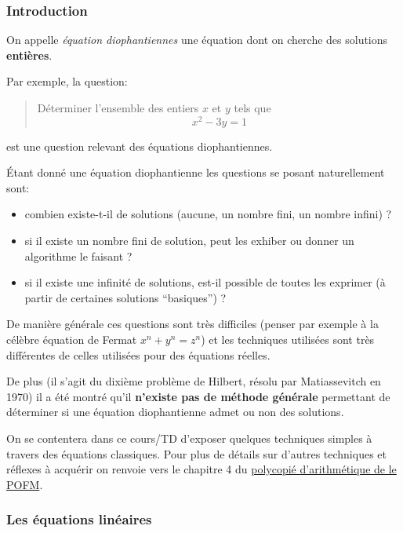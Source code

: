 
\subsubsection{Introduction}

On appelle \emph{équation diophantiennes} une équation dont on cherche des solutions \textbf{entières}.

Par exemple, la question:
\begin{quote}
  Déterminer l'ensemble des entiers \(x\) et
  \(y\) tels que \[x^2-3 y = 1\]
\end{quote}
est une question relevant des équations
diophantiennes.

Étant donné une équation diophantienne les questions se posant
naturellement sont:

\begin{itemize}
  \item  combien existe-t-il de solutions (aucune, un nombre fini, un nombre
        infini) ?
  \item  si il existe un nombre fini de solution, peut les exhiber ou donner un
        algorithme le faisant ?
  \item  si il existe une infinité de solutions, est-il possible de toutes les
        exprimer (à partir de certaines solutions ``basiques'') ?
\end{itemize}

De manière générale ces questions sont très difficiles (penser par
exemple à la célèbre équation de Fermat \(x^n+y^n=z^n\)) et les
techniques utilisées sont très différentes de celles utilisées pour des
équations réelles.

De plus (il s'agit du dixième problème de Hilbert, résolu par
Matiassevitch en 1970) il a été montré qu'il \textbf{n'existe pas de
  méthode générale} permettant de déterminer si une équation diophantienne
admet ou non des solutions.



On se contentera dans ce cours/TD d'exposer quelques techniques simples
à travers des équations classiques. Pour plus de détails sur d'autres
techniques et réflexes à acquérir on renvoie vers le chapitre 4 du
\href{https://maths-olympiques.fr/wp-content/uploads/2017/09/arith_cours.pdf}{polycopié d'arithmétique de le POFM}.


\subsubsection{Les équations linéaires}


